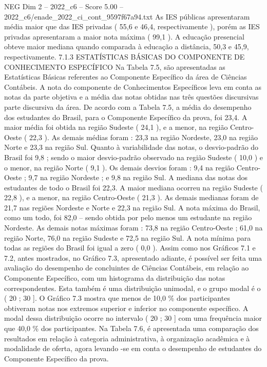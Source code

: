 \begin{textsample}{NEG Dim 2 – 2022\_c6 – Score 5.00 – 2022\_c6/enade\_2022\_ci\_cont\_9597f67a94.txt}
As IES públicas apresentaram média maior que das IES privadas ( 55,6 e 46,4, respectivamente ), porém as IES privadas apresentaram a maior nota máxima ( 99,1 ).
A educação presencial obteve maior mediana quando comparada à educação a distância, 50,3 e 45,9, respectivamente. 7.1.3 ESTATÍSTICAS BÁSICAS DO COMPONENTE DE CONHECIMENTO ESPECÍFICO Na Tabela 7.5, são apresentadas as Estatísticas Básicas referentes ao Componente Específico da área de Ciências Contábeis.
A nota do componente de Conhecimentos Específicos leva em conta as notas da parte objetiva e a média das notas obtidas nas três questões discursivas parte discursiva da área.
De acordo com a Tabela 7.5, a média do desempenho dos estudantes do Brasil, para o Componente Específico da prova, foi 23,4.
A maior média foi obtida na região Sudeste ( 24,1 ), e a menor, na região Centro-Oeste ( 22,3 ).
As demais médias foram : 23,3 na região Nordeste, 23,0 na região Norte e 23,3 na região Sul.
Quanto à variabilidade das notas, o desvio-padrão do Brasil foi 9,8 ; sendo o maior desvio-padrão observado na região Sudeste ( 10,0 ) e o menor, na região Norte ( 9,1 ).
Os demais desvios foram : 9,4 na região Centro-Oeste ; 9,7 na região Nordeste ; e 9,8 na região Sul.
A mediana das notas dos estudantes de todo o Brasil foi 22,3.
A maior mediana ocorreu na região Sudeste ( 22,8 ), e a menor, na região Centro-Oeste ( 21,3 ).
As demais medianas foram de 21,7 nas regiões Nordeste e Norte e 22,3 na região Sul.
A nota máxima do Brasil, como um todo, foi 82,0 – sendo obtida por pelo menos um estudante na região Nordeste.
As demais notas máximas foram : 73,8 na região Centro-Oeste ; 61,0 na região Norte, 76,0 na região Sudeste e 72,5 na região Sul.
A nota mínima para todas as regiões do Brasil foi igual a zero ( 0,0 ).
Assim como nos Gráficos 7.1 e 7.2, antes mostrados, no Gráfico 7.3, apresentado adiante, é possível ser feita uma avaliação do desempenho de concluintes de Ciências Contábeis, em relação ao Componente Específico, com um histograma da distribuição das notas correspondentes.
Esta também é uma distribuição unimodal, e o grupo modal é o ( 20 ; 30 ].
O Gráfico 7.3 mostra que menos de 10,0 \% dos participantes obtiveram notas nos extremos superior e inferior no componente específico.
A modal dessa distribuição ocorre no intervalo ( 20 ; 30 ] com uma frequência maior que 40,0 \% dos participantes.
Na Tabela 7.6, é apresentada uma comparação dos resultados em relação à categoria administrativa, à organização acadêmica e à modalidade de oferta, agora levando -se em conta o desempenho de estudantes do Componente Específico da prova.

\end{textsample}

